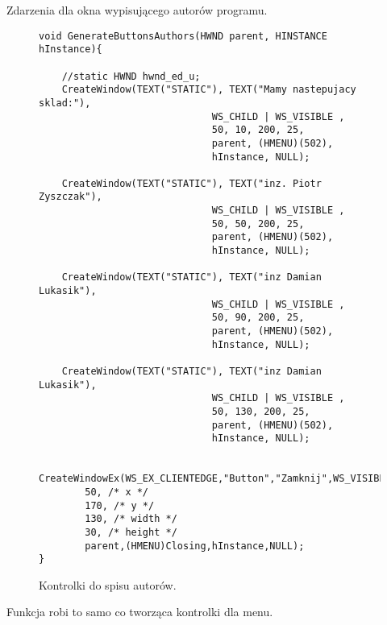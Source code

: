 \documentclass[a4paper,twoside,12pt]{mgr}
\begin{document}
Zdarzenia dla okna wypisującego autorów programu.
\begin{figure}[H]
\centering
\begin{lstlisting}[frame=single]	
void GenerateButtonsAuthors(HWND parent, HINSTANCE hInstance){
	
	//static HWND hwnd_ed_u;
	CreateWindow(TEXT("STATIC"), TEXT("Mamy nastepujacy sklad:"),
                              WS_CHILD | WS_VISIBLE ,
                              50, 10, 200, 25,
                              parent, (HMENU)(502),
                              hInstance, NULL);
							  	
	CreateWindow(TEXT("STATIC"), TEXT("inz. Piotr Zyszczak"),
                              WS_CHILD | WS_VISIBLE ,
                              50, 50, 200, 25,
                              parent, (HMENU)(502),
                              hInstance, NULL);
                              
    CreateWindow(TEXT("STATIC"), TEXT("inz Damian Lukasik"),
                              WS_CHILD | WS_VISIBLE ,
                              50, 90, 200, 25,
                              parent, (HMENU)(502),
                              hInstance, NULL);   
                              
	CreateWindow(TEXT("STATIC"), TEXT("inz Damian Lukasik"),
                              WS_CHILD | WS_VISIBLE ,
                              50, 130, 200, 25,
                              parent, (HMENU)(502),
                              hInstance, NULL);  
                              
	CreateWindowEx(WS_EX_CLIENTEDGE,"Button","Zamknij",WS_VISIBLE|WS_CHILD|BS_PUSHBUTTON,
		50, /* x */
		170, /* y */
		130, /* width */
		30, /* height */
		parent,(HMENU)Closing,hInstance,NULL);                      
}
\end{lstlisting}
\caption{Kontrolki do spisu autorów.}%
\label{rys:etykieta}
\end{figure}
Funkcja robi to samo co tworząca kontrolki dla menu.
\end{document}
